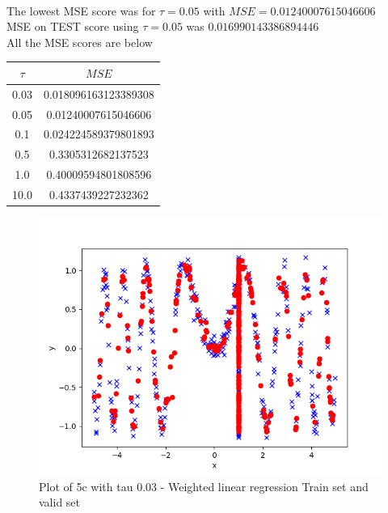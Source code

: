 \begin{answer}\\
The lowest MSE score was for $\tau=0.05$ with $MSE=0.01240007615046606$\\
MSE on TEST score using $\tau=0.05$ was $0.016990143386894446$\\
All the MSE scores are below
\begin{center}
\begin{tabular}{ |c|c| } 
 \hline
 $\tau$ & $MSE$ \\ 
 \hline
 0.03 & 0.018096163123389308 \\
 0.05 & 0.01240007615046606 \\
 0.1 & 0.024224589379801893 \\
 0.5 & 0.3305312682137523 \\
 1.0 & 0.40009594801808596 \\
 10.0 & 0.4337439227232362 \\ \hline
\end{tabular}
\end{center}
\begin{figure}
  \includegraphics[width=\linewidth]{../src/output/p05c_plot_0_03_tau.png}
  \caption{Plot of 5c with tau 0.03 - Weighted linear regression Train set and valid set}
  \label{fig:Plot of 5c with tau 0.03 - Weighted linear regression Train set and valid set}
\end{figure}
\begin{figure}

\end{figure}
\end{answer}
